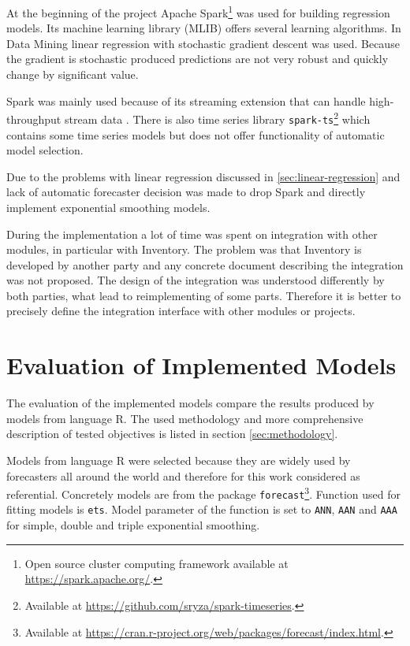     At the beginning of the project Apache Spark\footnote{Open source cluster computing framework available at
    \url{https://spark.apache.org/}.} was used for building regression models. Its machine learning library (MLIB)
    offers several learning algorithms. In Data Mining linear regression with stochastic gradient descent was used.
    Because the gradient is stochastic produced predictions are not very robust and quickly change by significant value.

    Spark was mainly used because of its streaming extension that can handle
    high-throughput stream data \cite{apache-spark}. There is also time series library
    \texttt{spark-ts}\footnote{Available at \url{https://github.com/sryza/spark-timeseries}.} which contains some
    time series models but does not offer functionality of automatic model selection.

    Due to the problems with linear regression discussed in \ref{sec:linear-regression} and lack of automatic
    forecaster decision was made to drop Spark and directly implement exponential smoothing models.

    During the implementation a lot of time was spent on integration with other modules, in particular with Inventory.
    The problem was that Inventory is developed by another party and any concrete document
    describing the integration was not proposed. The design of the integration was understood differently
    by both parties, what lead to reimplementing of some parts. Therefore it is better to precisely define the
    integration interface with other modules or projects.

\chapter{Evaluation of Implemented Models} \label{chap:evaluation}
The evaluation of the implemented models compare the results produced by models from language R.
The used methodology and more comprehensive description of tested objectives is listed in section \ref{sec:methodology}.

Models from language R were selected because they are widely used by forecasters all around the world and therefore
for this work considered as referential. Concretely models are from the package
\texttt{forecast}\footnote{Available at \url{https://cran.r-project.org/web/packages/forecast/index.html}.}.
Function used for fitting models is \texttt{ets}. Model parameter of the function is set to \texttt{ANN}, \texttt{AAN}
and \texttt{AAA} for simple, double and triple exponential smoothing.

